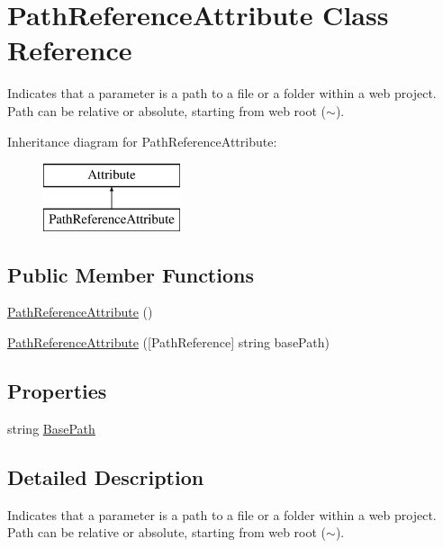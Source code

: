 \hypertarget{class_path_reference_attribute}{}\section{Path\+Reference\+Attribute Class Reference}
\label{class_path_reference_attribute}


Indicates that a parameter is a path to a file or a folder within a web project. Path can be relative or absolute, starting from web root ($\sim$).  


Inheritance diagram for Path\+Reference\+Attribute\+:\begin{figure}[H]
\begin{center}
\leavevmode
\includegraphics[height=2.000000cm]{class_path_reference_attribute}
\end{center}
\end{figure}
\subsection*{Public Member Functions}
\begin{DoxyCompactItemize}
\item 
\hyperlink{class_path_reference_attribute_acc0edf7e4dd23ad0340083ddfdaa4cba}{Path\+Reference\+Attribute} ()
\item 
\hyperlink{class_path_reference_attribute_a68daaaec94376b8e988ddcfd72229030}{Path\+Reference\+Attribute} (\mbox{[}Path\+Reference\mbox{]} string base\+Path)
\end{DoxyCompactItemize}
\subsection*{Properties}
\begin{DoxyCompactItemize}
\item 
string \hyperlink{class_path_reference_attribute_ae6cf5aa92a7198b24c0656f974c3738d}{Base\+Path}
\end{DoxyCompactItemize}


\subsection{Detailed Description}
Indicates that a parameter is a path to a file or a folder within a web project. Path can be relative or absolute, starting from web root ($\sim$). 




